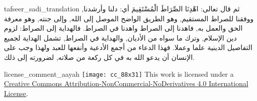 \begin{taggedblock}{tafseer_sadi_translation}
ثم قال تعالى:
{ اهْدِنَا الصِّرَاطَ الْمُسْتَقِيمَ }
أي: دلنا وأرشدنا, ووفقنا للصراط المستقيم, وهو الطريق الواضح الموصل إلى الله, وإلى جنته, وهو معرفة الحق والعمل به, فاهدنا إلى الصراط واهدنا في الصراط. فالهداية إلى الصراط: لزوم دين الإسلام, وترك ما سواه من الأديان, والهداية في الصراط, تشمل الهداية لجميع التفاصيل الدينية علما وعملا. فهذا الدعاء من أجمع الأدعية وأنفعها للعبد ولهذا وجب على الإنسان أن يدعو الله به في كل ركعة من صلاته, لضرورته إلى ذلك.
\end{taggedblock}
\begin{taggedblock}{license_comment_aayah}
\texttt{[image: cc\_88x31]}
This work is licensed under a 
\href{http://creativecommons.org/licenses/by-nc-nd/4.0/}{Creative Commons Attribution-NonCommercial-NoDerivatives 4.0 International License}.
\end{taggedblock}
\begin{comment}
Please use the following for footnotes:- Sample\footnoteQ{Text of Qur'an footnote goes here.}.
Sample\footnoteT{Text of Tafseer footnote goes here.}.
\end{comment}